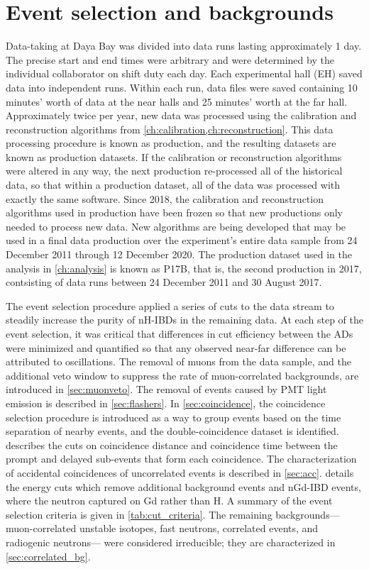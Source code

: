 \chapter{Event selection and backgrounds}
\label{ch:event_selection}

Data-taking at Daya Bay was divided into data runs
lasting approximately 1 day.
The precise start and end times were arbitrary
and were determined by the individual collaborator
on shift duty each day.
Each experimental hall (EH) saved data into independent runs.
Within each run, data files were saved containing 10 minutes' worth of data
at the near halls and 25 minutes' worth at the far hall.
Approximately twice per year, new data was processed
using the calibration and reconstruction algorithms from
\cref{ch:calibration,ch:reconstruction}.
This data processing procedure is known as production, and the resulting datasets
are known as production datasets.
If the calibration or reconstruction algorithms were altered in any way,
the next production re-processed all of the historical data,
so that within a production dataset, all of the data was processed
with exactly the same software.
Since 2018, the calibration and reconstruction algorithms used in production have been
frozen so that new productions only needed to process new data.
New algorithms are being developed that may be used
in a final data production over the experiment's entire data sample
from 24 December 2011 through 12 December 2020.
The production dataset used in the \thetaot{} analysis in \cref{ch:analysis} is known as P17B,
that is, the second production in 2017,
contsisting of data runs between 24 December 2011
and 30 August 2017.

The event selection procedure applied a series of cuts to the data stream
to steadily increase the purity of nH-IBDs in the remaining data.
At each step of the event selection, it was critical that
differences in cut efficiency between the ADs were
minimized and quantified so that any observed near-far difference
can be attributed to \nuebar{} oscillations.
The removal of muons from the data sample, and the additional veto window
to suppress the rate of muon-correlated backgrounds,
are introduced in \cref{sec:muonveto}.
The removal of events caused by PMT light emission
is described in \cref{sec:flashers}.
In \cref{sec:coincidence}, the coincidence selection procedure
is introduced as a way to group events based on
the time separation of nearby events,
and the double-coincidence dataset is identified.
 describes the cuts on coincidence distance and coincidence time
between the prompt and delayed sub-events that form each coincidence.
The characterization of
accidental coincidences of uncorrelated events
is described in \cref{sec:acc}.
 details the energy cuts
which remove additional background events
and nGd-IBD events, where the neutron captured on Gd rather than H.
A summary of the event selection criteria is given in \cref{tab:cut_criteria}.
The remaining backgrounds---muon-correlated unstable isotopes,
fast neutrons, \amc{} correlated events, and radiogenic neutrons---%
were considered irreducible;
they are characterized in \cref{sec:correlated_bg}.

